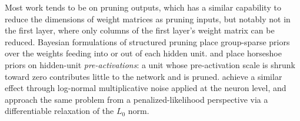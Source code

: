 Most work tends to be on pruning outputs, which has a similar capability to reduce the dimensions of weight matrices as pruning inputs, but notably not in the first layer, where only columns of the first layer's weight matrix can be reduced.
Bayesian formulations of structured pruning place group-sparse priors
over the weights feeding into or out of each hidden unit. \citet{ghosh_structured_2018} and
\citet{ghosh_model_nodate} place horseshoe priors on hidden-unit
\emph{pre-activations}: a unit whose pre-activation scale is shrunk
toward zero contributes little to the network and is pruned.
\citet{neklyudov_structured_2017} achieve a similar effect through
log-normal multiplicative noise applied at the neuron level, and
\citet{louizos_learning_2018} approach the same problem from a
penalized-likelihood perspective via a differentiable relaxation of
the $L_0$ norm.






